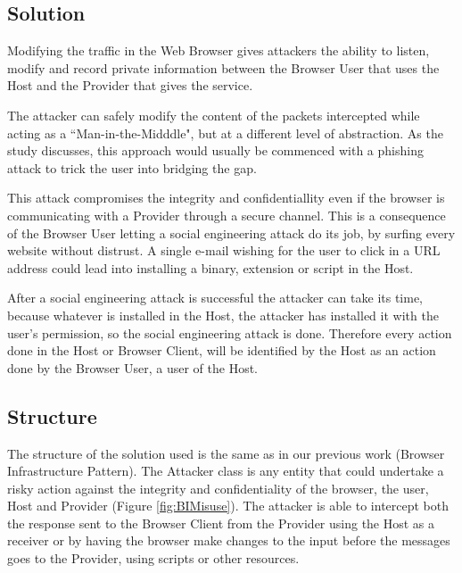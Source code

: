 \documentclass{sig-alternate-05-2015}
\begin{document}
\subsection*{Solution}
Modifying the traffic in the Web Browser gives attackers the ability to listen, modify and record private information between the Browser User that uses the Host and the Provider that gives the service.

The attacker can safely modify the content of the packets intercepted while acting as a ``Man-in-the-Midddle", but at a different level of abstraction. As the study \cite{Dougan2012} discusses, this approach would usually be commenced with a phishing attack to trick the user into bridging the gap.

This attack compromises the integrity and confidentiallity even if the browser is communicating with a Provider through a secure channel. This is a consequence of the Browser User letting a social engineering attack do its job, by surfing every website without distrust. A single e-mail wishing for the user to click in a URL address could lead into installing a binary, extension or script in the Host.

After a social engineering attack is successful the attacker can take its time, because whatever is installed in the Host, the attacker has installed it with the user's permission, so the social engineering attack is done. Therefore every action done in the Host or Browser Client, will be identified by the Host as an action done by the Browser User, a user of the Host.


\subsection*{Structure}
The structure of the solution used is the same as in our previous work (Browser Infrastructure Pattern). The Attacker class is any entity that could undertake a risky action against the integrity and confidentiality of the browser, the user, Host and Provider (Figure \ref{fig:BIMisuse}). The attacker is able to intercept both the response sent to the Browser Client from the Provider using the Host as a receiver or by having the browser make changes to the input before the messages goes to the Provider, using scripts or other resources.  
\end{document}
